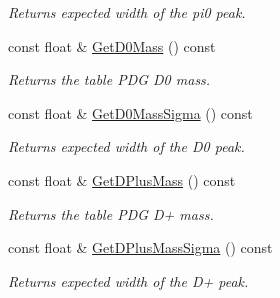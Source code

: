 \begin{DoxyCompactItemize}
\begin{DoxyCompactList}\small\item\em Returns expected width of the pi0 peak. \end{DoxyCompactList}\item 
const float \& \hyperlink{classKFParticleDatabase_ab4e7d6f4bab1e629227e941b2e7e699f}{Get\+D0\+Mass} () const \hypertarget{classKFParticleDatabase_ab4e7d6f4bab1e629227e941b2e7e699f}{}\label{classKFParticleDatabase_ab4e7d6f4bab1e629227e941b2e7e699f}

\begin{DoxyCompactList}\small\item\em Returns the table P\+DG D0 mass. \end{DoxyCompactList}\item 
const float \& \hyperlink{classKFParticleDatabase_a9fb81196912ba3fb09133cbdf9551e54}{Get\+D0\+Mass\+Sigma} () const \hypertarget{classKFParticleDatabase_a9fb81196912ba3fb09133cbdf9551e54}{}\label{classKFParticleDatabase_a9fb81196912ba3fb09133cbdf9551e54}

\begin{DoxyCompactList}\small\item\em Returns expected width of the D0 peak. \end{DoxyCompactList}\item 
const float \& \hyperlink{classKFParticleDatabase_a2d023c1352c0a06275416334fdc64ffa}{Get\+D\+Plus\+Mass} () const \hypertarget{classKFParticleDatabase_a2d023c1352c0a06275416334fdc64ffa}{}\label{classKFParticleDatabase_a2d023c1352c0a06275416334fdc64ffa}

\begin{DoxyCompactList}\small\item\em Returns the table P\+DG D+ mass. \end{DoxyCompactList}\item 
const float \& \hyperlink{classKFParticleDatabase_a00ae02168b1ab26073cae77db74cfeec}{Get\+D\+Plus\+Mass\+Sigma} () const \hypertarget{classKFParticleDatabase_a00ae02168b1ab26073cae77db74cfeec}{}\label{classKFParticleDatabase_a00ae02168b1ab26073cae77db74cfeec}

\begin{DoxyCompactList}\small\item\em Returns expected width of the D+ peak. \end{DoxyCompactList}\end{DoxyCompactItemize}
